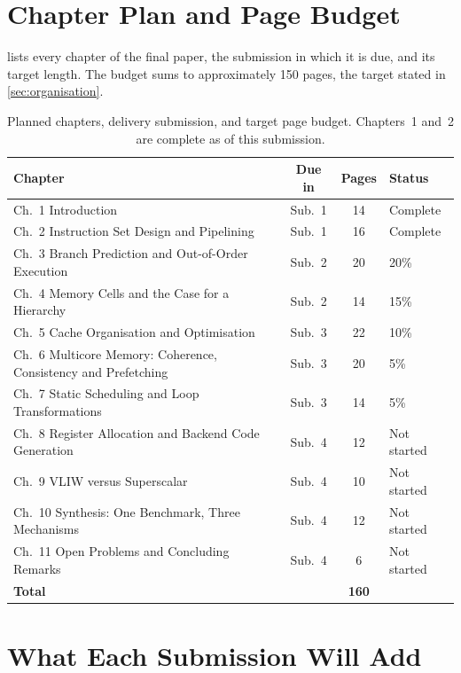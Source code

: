 \documentclass[12pt,a4paper]{report}
\begin{document}
\section{Chapter Plan and Page Budget}
\label{sec:plan-chapters}

 lists every chapter of the final paper, the
submission in which it is due, and its target length. The budget sums to
approximately 150 pages, the target stated in \cref{sec:organisation}.

\begin{table}[htbp]
\centering
\caption{Planned chapters, delivery submission, and target page budget.
Chapters~1 and~2 are complete as of this submission.}
\label{tab:page-budget}
\begin{tabular}{@{}L{0.42\textwidth}ccL{0.26\textwidth}@{}}
\toprule
\textbf{Chapter} & \textbf{Due in} & \textbf{Pages} & \textbf{Status} \\
\midrule
Ch.~1 Introduction & Sub.~1 & 14 & Complete \\
Ch.~2 Instruction Set Design and Pipelining & Sub.~1 & 16 & Complete \\
\midrule
Ch.~3 Branch Prediction and Out-of-Order Execution & Sub.~2 & 20 & 20\% \\
Ch.~4 Memory Cells and the Case for a Hierarchy & Sub.~2 & 14 & 15\% \\
Ch.~5 Cache Organisation and Optimisation & Sub.~3 & 22 & 10\% \\
Ch.~6 Multicore Memory: Coherence, Consistency and Prefetching & Sub.~3 & 20 & 5\% \\
\midrule
Ch.~7 Static Scheduling and Loop Transformations & Sub.~3 & 14 & 5\% \\
Ch.~8 Register Allocation and Backend Code Generation & Sub.~4 & 12 & Not started \\
Ch.~9 VLIW versus Superscalar & Sub.~4 & 10 & Not started \\
\midrule
Ch.~10 Synthesis: One Benchmark, Three Mechanisms & Sub.~4 & 12 & Not started \\
Ch.~11 Open Problems and Concluding Remarks & Sub.~4 & 6 & Not started \\
\midrule
\textbf{Total} & & \textbf{160} & \\
\bottomrule
\end{tabular}
\end{table}

\section{What Each Submission Will Add}
\label{sec:plan-submissions}
\end{document}
